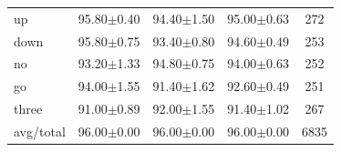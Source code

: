 \documentclass{beamer}
\begin{document}
{\begin{table}
\begin{tabular}{lcccc}
		up        &  95.80$\pm$0.40 &  94.40$\pm$1.50 &  95.00$\pm$0.63 &     272 \\
		down      &  95.80$\pm$0.75 &  93.40$\pm$0.80 &  94.60$\pm$0.49 &     253 \\
		no        &  93.20$\pm$1.33 &  94.80$\pm$0.75 &  94.00$\pm$0.63 &     252 \\
		go        &  94.00$\pm$1.55 &  91.40$\pm$1.62 &  92.60$\pm$0.49 &     251 \\
		three     &  91.00$\pm$0.89 &  92.00$\pm$1.55 &  91.40$\pm$1.02 &     267 \\
		\midrule avg/total &  96.00$\pm$0.00 &  96.00$\pm$0.00 &  96.00$\pm$0.00 &    6835 \\
		\bottomrule
	\end{tabular}

\end{table}

}

\end{document}
